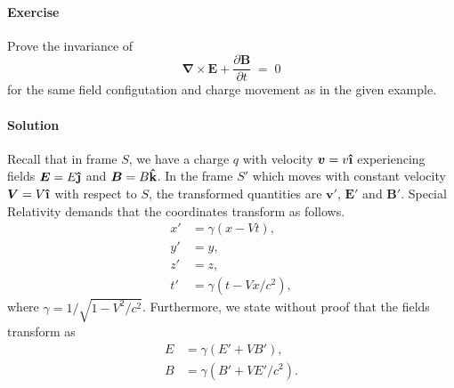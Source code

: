 \documentclass[10pt]{article}
\let\vec\boldsymbol
\newcommand{\uveci}{{\bm{\hat{\textnormal{\bfseries\i}}}}}
\newcommand{\uvecj}{{\bm{\hat{\textnormal{\bfseries\j}}}}}
\newcommand{\uveck}{{\bm{\hat{\textnormal{\bfseries k}}}}}
\newcommand\curl[1]{\vec{\nabla}\times#1}
\newcommand\pp[2]{\frac{\partial #1}{\partial #2}}
\newcounter{prob}
\def\problem{\stepcounter{prob}\paragraph{Exercise \arabic{prob}}}
\def\solution{\paragraph{Solution}}
\begin{document}
        \problem Prove the invariance of 
        \[
                \curl{\vec{E}} + \pp{\vec{B}}{t} \;=\; 0
        \]
        for the same field configutation and charge movement as in the given example.
        \solution Recall that in frame $S$, we have a charge $q$ with velocity $\vec{v} = v\uveci$ experiencing fields $\vec{E} = E \uvecj$
        and $\vec{B} = B\uveck$. In the frame $S'$ which moves with constant velocity $\vec{V} = V\uveci$ with respect to $S$, the transformed
        quantities are $\vec{v}'$, $\vec{E}'$ and $\vec{B}'$.
        Special Relativity demands that the coordinates transform as follows.
        \begin{align*}
                x' &= \gamma(x - Vt), \\
                y' &= y, \\
                z' &= z, \\
                t' &= \gamma(t - Vx/c^2),
        \end{align*}
        where $\gamma = 1 /\sqrt{1 - V^2 /c^2}$.
        Furthermore, we state without proof that the fields transform as
        \begin{align*}
        {E} &= \gamma({E}' + V{B}'), \\
        {B} &= \gamma({B}' + V{E}' /c^2).
        \end{align*}
\end{document}
